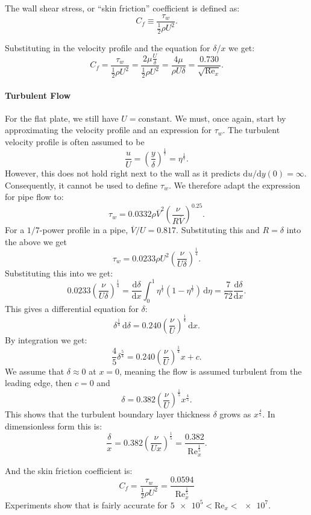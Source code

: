The wall shear stress, or ``skin friction'' coefficient is defined as:
\[ 
C_f \equiv \frac{\tau_w}{\frac{1}{2}\rho U^2}
.\]

Substituting in the velocity profile and the equation for $\delta / x$ we get:
\[ 
C_f = \frac{\tau_w}{\frac{1}{2}\rho U^2} = \frac{2 \mu \frac{U}{\delta}}{\frac{1}{2} \rho U^2} = \frac{4 \mu}{\rho U \delta} = \frac{\num{0,730} }{\sqrt{\mathrm{Re}_x}}
.\]


\paragraph{Turbulent Flow}
For the flat plate, we still have $U = \text{constant}$.
We must, once again, start by approximating the velocity profile and an expression for $\tau_w$.
The turbulent velocity profile is often assumed to be
\[ 
\frac{u}{U} = \left( \frac{y}{\delta} \right)^{\frac{1}{7}} = \eta^{\frac{1}{7}}
.\]
However, this does not hold right next to the wall as it predicts $\mathrm{d}u / \mathrm{d}y (0) = \infty$.
Consequently, it cannot be used to define $\tau_w$.
We therefore adapt the expression for pipe flow to:
\[ 
\tau_w = \num{0,0332} \rho \overline{V}^2 \left( \frac{\nu}{R \overline{V}} \right)^{\num{0,25} }
.\]
For a $1 / 7$-power profile in a pipe, $\overline{V} / U = \num{0,817}$.
Substituting this and $R = \delta$ into the above we get
\[ 
\tau_w = \num{0,0233} \rho U^2 \left( \frac{\nu}{U \delta} \right)^{\frac{1}{4}}
.\]
Substituting this into  we get:
\[ 
\num{0,0233}  \left( \frac{\nu}{U \delta} \right)^{\frac{1}{4}} = \frac{\mathrm{d}\delta}{\mathrm{d}x} \int_{0}^{1} \eta^{\frac{1}{7}} \left( 1 - \eta^{\frac{1}{7}} \right)\, \mathrm{d}\eta = \frac{7}{72} \frac{\mathrm{d}\delta}{\mathrm{d}x} 
.\]
This gives a differential equation for $\delta$:
\[ 
\delta^{\frac{1}{4}} \, \mathrm{d}\delta = \num{0,240}  \left( \frac{\nu}{U} \right)^{\frac{1}{4}} \, \mathrm{d}x 
.\]
By integration we get:
\[ 
\frac{4}{5} \delta^{\frac{5}{4}} = \num{0,240} \left( \frac{\nu}{U} \right)^{\frac{1}{4}} x + c
.\]
We assume that $\delta \approx 0$ at $x = 0$, meaning the flow is assumed turbulent from the leading edge, then $c = 0$ and
\[ 
\delta = \num{0,382} \left( \frac{\nu}{U} \right)^{\frac{1}{5}} x^{\frac{4}{5}}
.\]
This shows that the turbulent boundary layer thickness $\delta$ grows as $x^{\frac{4}{5}}$.
In dimensionless form this is:
\[ 
\frac{\delta}{x} = \num{0,382} \left( \frac{\nu}{Ux} \right)^{\frac{1}{5}} = \frac{\num{0,382} }{\mathrm{Re}_x^{\frac{1}{5}}}
.\]

And the skin friction coefficient is:
\begin{equation} \label{eq:turbskinfric}
  C_f = \frac{\tau_w}{\frac{1}{2}\rho U^2} = \frac{\num{0,0594} }{\mathrm{Re}_x^{\frac{1}{5}}}
\end{equation}
Experiments show that  is fairly accurate for $\num{5e5} < \mathrm{Re}_x < \num{e7}$.



